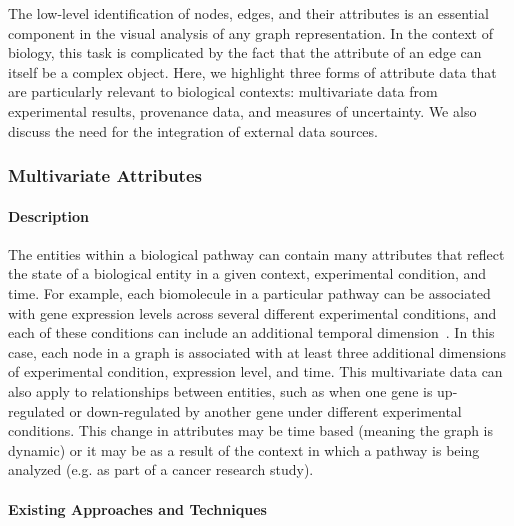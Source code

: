 The low-level identification of nodes, edges, and their attributes is an essential component in the visual analysis of any graph representation.
In the context of biology, this task is complicated by the fact that the attribute of an edge can itself be a complex object.
Here, we highlight three forms of attribute data that are particularly relevant to biological contexts: multivariate data from experimental results, provenance data, and measures of uncertainty.
We also discuss the need for the integration of external data sources.

\subsubsection{Multivariate Attributes}

\paragraph{Description}

The entities within a biological pathway can contain many attributes that reflect the state of a biological entity in a given context, experimental condition, and time.
For example, each biomolecule in a particular pathway can be associated with gene expression levels across several different experimental conditions, and each of these conditions can include an additional temporal dimension~\cite{Barsky2008cerebral}.
In this case, each node in a graph is associated with at least three additional dimensions of experimental condition, expression level, and time.
This multivariate data can also apply to relationships between entities, such as when one gene is up-regulated or down-regulated by another gene under different experimental conditions.
This change in attributes may be time based (meaning the graph is dynamic) or it may be as a result of the context in which a pathway is being analyzed (e.g. as part of a cancer research study).


\paragraph{Existing Approaches and Techniques}

